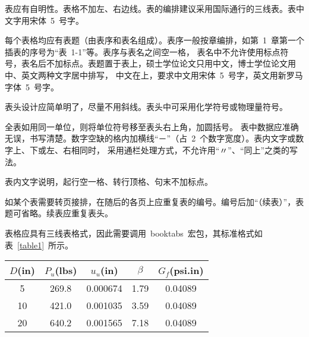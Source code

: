 

表应有自明性。表格不加左、右边线。表的编排建议采用国际通行的三线表。表中文字用宋体~5~号字。

每个表格均应有表题（由表序和表名组成）。表序一般按章编排，如第~1~章第一个插表的序号为“表~1-1”等。表序与表名之间空一格，
表名中不允许使用标点符号，表名后不加标点。表题置于表上，硕士学位论文只用中文，博士学位论文用中、英文两种文字居中排写，
中文在上，要求中文用宋体~5~号字，英文用新罗马字体~5~号字。

表头设计应简单明了，尽量不用斜线。表头中可采用化学符号或物理量符号。

全表如用同一单位，则将单位符号移至表头右上角，加圆括号。
表中数据应准确无误，书写清楚。数字空缺的格内加横线“－”（占~2~个数字宽度）。表内文字或数字上、下或左、右相同时，
采用通栏处理方式，不允许用“〃”、“同上”之类的写法。

表内文字说明，起行空一格、转行顶格、句末不加标点。

如某个表需要转页接排，在随后的各页上应重复表的编号。编号后加“（续表）”，表题可省略。续表应重复表头。


表格应具有三线表格式，因此需要调用~booktabs~宏包，其标准格式如表~\ref{table1}~所示。
\begin{table}[htbp]
\vspace{0.5em}\centering\wuhao
\begin{tabular}{ccccc}
\toprule[1.5pt]
$D$(in) & $P_u$(lbs) & $u_u$(in) & $\beta$ & $G_f$(psi.in)\\
\midrule[1pt]
 5 & 269.8 & 0.000674 & 1.79 & 0.04089\\
10 & 421.0 & 0.001035 & 3.59 & 0.04089\\
20 & 640.2 & 0.001565 & 7.18 & 0.04089\\
\bottomrule[1.5pt]
\end{tabular}
\end{table}

